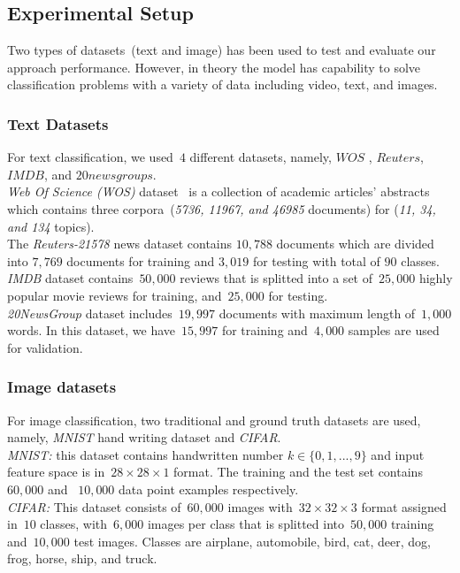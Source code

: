\documentclass[sigconf, final]{acmart}
\begin{document}
\begin{figure*}[htbp]
\end{figure*}\subsection{Experimental Setup} 
Two types of datasets~(text and image) has been used to test and evaluate our approach performance. However, in theory the model has capability to solve classification problems with a variety of data including video, text, and images.  
\subsubsection{Text Datasets}
For text classification, we used~$4$ different datasets, namely, $WOS$ , $Reuters$, $IMDB$, and $20newsgroups$.\\ \textit{Web Of Science (WOS)} dataset~\cite{kowsari2018WOS} is a collection of academic articles' abstracts which contains three corpora~(\textit{5736, 11967, and 46985 }documents) for (\textit{11, 34, and 134} topics).\\ The \textit{Reuters-21578}  news dataset contains $10,788$ documents which are divided into $7,769$ documents for training and $3,019$ for testing with total of $90$ classes.\\
\textit{IMDB} dataset contains~$50,000$ reviews that is splitted into a set of~$25,000$ highly popular movie reviews for training, and~$25,000$ for testing.\\
\textit{20NewsGroup} dataset includes~$19,997$ documents with maximum length of~$1,000$ words. In this dataset, we have~$15,997$ for training and~$4,000$ samples are used for validation.
\subsubsection{Image datasets}
For image classification, two traditional and ground truth datasets are used, namely, \textit{MNIST} hand writing dataset and \textit{CIFAR}.\\\textit{MNIST:} this dataset contains handwritten number $k\in\{0,1,...,9\}$ and input feature space is in~$28\times28\times1$ format. The training and the test set contains~$60,000$ and ~$10,000$ data point examples respectively.\\ \textit{CIFAR:} This dataset consists of~$60,000$ images with~$32\times32\times3$ format assigned in~$10$ classes, with~$6,000$ images per class that is splitted into~$50,000$ training and~$10,000$ test images. Classes are airplane, automobile, bird, cat, deer, dog, frog, horse, ship, and truck.
\end{document}
